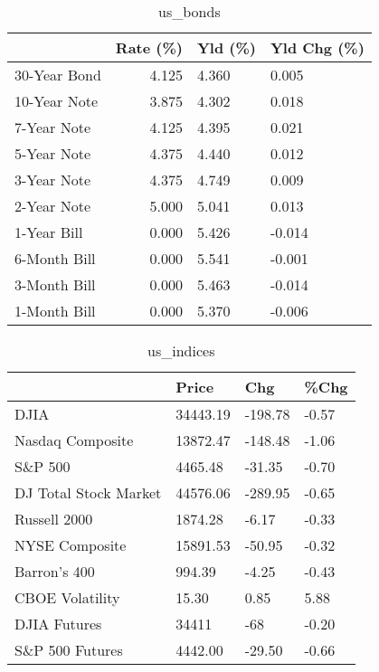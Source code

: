 \documentclass{article}%
\begin{document}
%


\begin{table}[htbp]%
\caption{us\_bonds}%
\centering%
\begin{adjustbox}{width=1\textwidth}%
\begin{tabular}{lrll}
\toprule
             &  Rate (\%) & Yld (\%) & Yld Chg (\%) \\
\midrule
30-Year Bond &     4.125 &   4.360 &       0.005 \\
10-Year Note &     3.875 &   4.302 &       0.018 \\
 7-Year Note &     4.125 &   4.395 &       0.021 \\
 5-Year Note &     4.375 &   4.440 &       0.012 \\
 3-Year Note &     4.375 &   4.749 &       0.009 \\
 2-Year Note &     5.000 &   5.041 &       0.013 \\
 1-Year Bill &     0.000 &   5.426 &      -0.014 \\
6-Month Bill &     0.000 &   5.541 &      -0.001 \\
3-Month Bill &     0.000 &   5.463 &      -0.014 \\
1-Month Bill &     0.000 &   5.370 &      -0.006 \\
\bottomrule
\end{tabular}
%
\end{adjustbox}%
\end{table}

%


\begin{table}[htbp]%
\caption{us\_indices}%
\centering%
\begin{adjustbox}{width=1\textwidth}%
\begin{tabular}{llll}
\toprule
                      &    Price &     Chg &  \%Chg \\
\midrule
                 DJIA & 34443.19 & -198.78 & -0.57 \\
     Nasdaq Composite & 13872.47 & -148.48 & -1.06 \\
              S\&P 500 &  4465.48 &  -31.35 & -0.70 \\
DJ Total Stock Market & 44576.06 & -289.95 & -0.65 \\
         Russell 2000 &  1874.28 &   -6.17 & -0.33 \\
       NYSE Composite & 15891.53 &  -50.95 & -0.32 \\
         Barron's 400 &   994.39 &   -4.25 & -0.43 \\
      CBOE Volatility &    15.30 &    0.85 &  5.88 \\
         DJIA Futures &    34411 &     -68 & -0.20 \\
      S\&P 500 Futures &  4442.00 &  -29.50 & -0.66 \\
\bottomrule
\end{tabular}
%
\end{adjustbox}%
\end{table}
\end{document}
